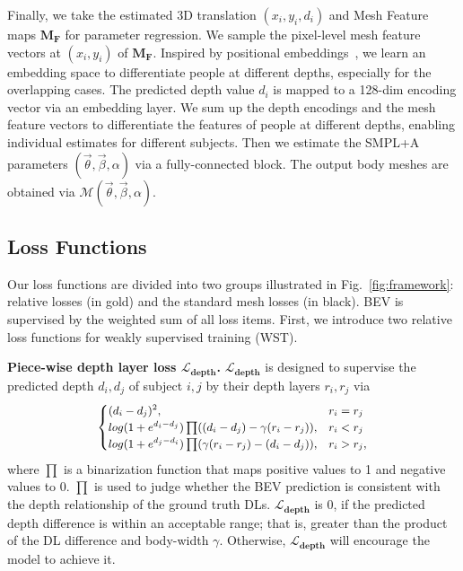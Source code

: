 \documentclass[10pt,twocolumn,letterpaper]{article}
\begin{document}
Finally, we take the estimated 3D translation $(x_i, y_i, d_i)$ and Mesh Feature maps $\boldsymbol{M_F}$ for parameter regression.
We sample the pixel-level mesh feature vectors at $(x_i, y_i)$ of $\boldsymbol{M_F}$. 
Inspired by positional embeddings~\cite{transformer}, we learn an embedding space to differentiate people at different depths, especially for the overlapping cases.
The predicted depth value $d_i$ is mapped to a 128-dim encoding vector via an embedding layer.
We sum up the depth encodings and the mesh feature vectors to differentiate the features of people at different depths, enabling individual estimates for different subjects.
Then we estimate the SMPL+A parameters $(\vec{\theta},\vec{\beta},\alpha)$ via a fully-connected block.
The output body meshes are obtained via $\mathcal{M}(\vec{\theta},\vec{\beta},\alpha)$. 



\subsection{Loss Functions}\label{sec:loss_functions}

Our loss functions are divided into two groups illustrated in Fig.~\ref{fig:framework}: relative losses (in gold) and the standard mesh losses (in black).
BEV is supervised by the weighted sum of all loss items.
First, we introduce two relative loss functions for weakly supervised training (WST).

\textbf{Piece-wise depth layer loss $\boldsymbol{\mathcal{L}_{depth}}$.}
$\boldsymbol{\mathcal{L}_{depth}}$ is designed to supervise the predicted depth $d_i, d_j$ of subject $i, j$ by their depth layers $r_i, r_j$ via
\begin{equation}
\setlength{\abovedisplayskip}{1pt}
\setlength{\belowdisplayskip}{1pt}
\small
\begin{aligned}
\begin{cases} 
      (d_i-d_j)^2, & r_i=r_j\\
      log(1+e^{d_i-d_j})\prod((d_i-d_j)-\gamma(r_i-r_j)), & r_i < r_j \\
      log(1+e^{d_j-d_i})\prod(\gamma(r_i-r_j)-(d_i-d_j)), & r_i > r_j ,\\
\end{cases}
\end{aligned}
\label{eq:hierarchical_depth}
\end{equation}
where $\prod$ is a binarization function that maps positive values to 1 and negative values to 0.
$\prod$ is used to judge whether the BEV prediction is consistent with the depth relationship of the ground truth  DLs.
$\boldsymbol{\mathcal{L}_{depth}}$ is 0, if the predicted depth difference is within an acceptable range; that is, greater than the product of the DL difference and body-width $\gamma$.
Otherwise, $\boldsymbol{\mathcal{L}_{depth}}$ will encourage the model to achieve it.
\end{document}
